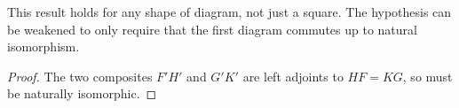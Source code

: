 This result holds for any shape of diagram, not just a square.
The hypothesis can be weakened to only require that the first diagram commutes up to natural isomorphism.
\begin{proof}
    The two composites \( F'H' \) and \( G'K' \) are left adjoints to \( HF = KG \), so must be naturally isomorphic.
\end{proof}
